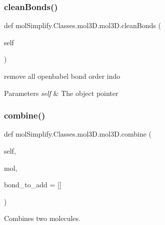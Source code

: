 \subsubsection{\texorpdfstring{clean\+Bonds()}{cleanBonds()}}
{\footnotesize\ttfamily def mol\+Simplify.\+Classes.\+mol3\+D.\+mol3\+D.\+clean\+Bonds (\begin{DoxyParamCaption}\item[{}]{self }\end{DoxyParamCaption})}



remove all openbabel bond order indo 


\begin{DoxyParams}{Parameters}
{\em self} & The object pointer \\
\hline
\end{DoxyParams}
\mbox{\label{classmolSimplify_1_1Classes_1_1mol3D_1_1mol3D_a8d6c548c5001b97eca53b4193eadd1ba}} 
\subsubsection{\texorpdfstring{combine()}{combine()}}
{\footnotesize\ttfamily def mol\+Simplify.\+Classes.\+mol3\+D.\+mol3\+D.\+combine (\begin{DoxyParamCaption}\item[{}]{self,  }\item[{}]{mol,  }\item[{}]{bond\+\_\+to\+\_\+add = {\ttfamily \mbox{[}\mbox{]}} }\end{DoxyParamCaption})}



Combines two molecules. 

